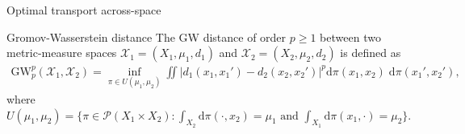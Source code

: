 \documentclass{beamer}
\newcommand{\gw}{\text{GW}}
\newcommand{\cX}{\mathcal X}
\newcommand{\rmd}{\mathrm{d}}
\begin{document}
\begin{frame}{Optimal transport across-space}
  \vspace{-0cm}
  \scriptsize
  \begin{block}{Gromov-Wasserstein distance \parencite{Memoli07,Memoli11}}
  The GW distance of order $p \geq 1$ between two metric-measure spaces
  $\cX_1 = (X_1, \mu_1, d_1)$ and $\cX_2 = (X_2, \mu_2, d_2)$ is defined as
  \begin{align*}
    \gw_p^p(\cX_1, \cX_2) = \inf_{\pi \in U(\mu_1, \mu_2)}
    \iint \left| d_1(x_1, x_1') - d_2(x_2, x_2') \right|^p
    \rmd\pi(x_1, x_2) \; \rmd\pi(x_1', x_2'),
  \end{align*}
  where $U(\mu_1, \mu_2) = \{ \pi \in \mathcal P(X_1 \times X_2): \int_{X_2} \rmd\pi(\cdot, x_2) = \mu_1 \text{ and } \int_{X_1} \rmd\pi(x_1, \cdot) = \mu_2 \}$.
\end{block}



\end{frame}
\end{document}
